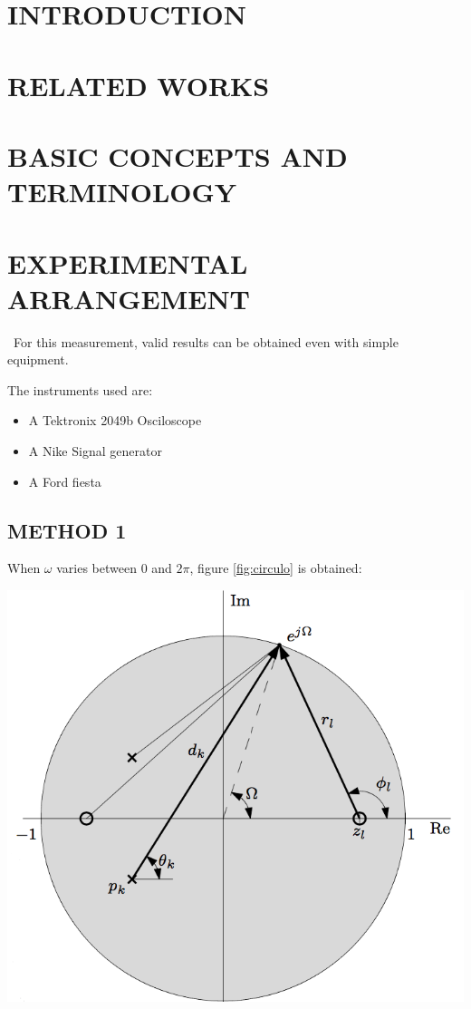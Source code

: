 \documentclass[]{article}
\makeatletter
\newenvironment{figurehere}		%
  {\def\@captype{figure}}		%
  {}							%
\makeatother
\begin{document}
\begin{multicols}{2}
\section{INTRODUCTION}
\lipsum[2]
\section{RELATED WORKS}
\lipsum[3]
\section{BASIC CONCEPTS AND TERMINOLOGY}
\lipsum[4]
\section{EXPERIMENTAL ARRANGEMENT}
\lipsum[5]
\
For this measurement, valid results can be obtained even with simple equipment.

The instruments used are:
\begin{itemize}
  \item A Tektronix 2049b Osciloscope
  \item A Nike Signal generator
  \item A Ford fiesta
\end{itemize}

\subsection{METHOD 1}
\lipsum[6]
When $\omega$ varies between $0$ and $2 \pi$, figure \ref{fig:circulo} is obtained:

\begin{figurehere}
 \centering
 \includegraphics[width=\linewidth]{lathi}
 \label{fig:circulo}
\end{figurehere}


\end{multicols}
\end{document}
